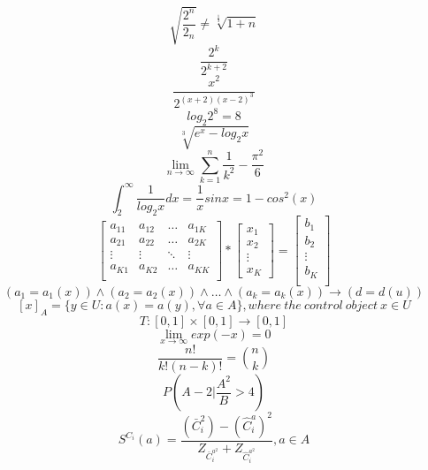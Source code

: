 \documentclass[12pt]{article}
\begin{document}
$$ \sqrt{ \frac{2^{n}}{2_n}} \neq \sqrt[\frac{1}{3}]{1+n} $$
$$ \frac{2^{k}}{2^{k+2}}$$
$$ \frac{x^{2}}{2^{(x+2)(x-2)^{3}}}$$
$$log_{2}2^{8}=8$$
$$\sqrt[3]{e^{x} - log_2 x}$$
$$ \lim_{n \rightarrow \infty} \sum_{k=1}^{n} \frac{1}{k^{2}} - \frac{\pi^{2}}{6}$$
$$ \int_2^{\infty} \frac{1}{log_2x}dx = \frac{1}{x}sinx=1- cos^{2}(x)$$
$$\mathbf{}
\left[ \begin{array}{cccc}
a_{11} & a_{12} & \dots & a_{1K}\\
a_{21} & a_{22} & \ldots & a_{2K}\\
\vdots & \vdots & \ddots & \vdots \\
a_{K1} & a_{K2} & \dots & a_{KK}\\
\end{array} \right] *
\left[ \begin{array}{c}
x_1\\
x_2\\
\vdots\\
x_K
\end{array} \right] =
\left [ \begin{array}{c}
b_1\\
b_2\\
\vdots\\
b_K\\
\end{array} \right] $$
$$(a_1=a_1(x)) \wedge (a_2 =a_2(x)) \wedge \dots \wedge (a_k=a_k(x)) \rightarrow (d=d(u)) $$
$$ [x]_A= \{ y \in U : a(x)= a(y), \forall a \in A\}, where\ the\ control\ object\ x \in U $$
$$ T : [0,1] \times [0,1] \rightarrow [0,1] $$
$$ \lim_{x \rightarrow \infty} exp(-x)=0$$
$$\frac{n!}{k!(n-k)!}= {n \choose k}$$
$$ P \left(A-2 | \frac{A^2}{B} > 4 \right)$$
$$ S^{C_i} (a) = \frac{(\bar{C}_i^{2})- (\hat{C}_i^{a})^{2}} {Z_{\bar{C}_i^{{a}^2}}+Z_{\hat{C}_i^{{a}^2}}}, a \in A $$
\end{document}
